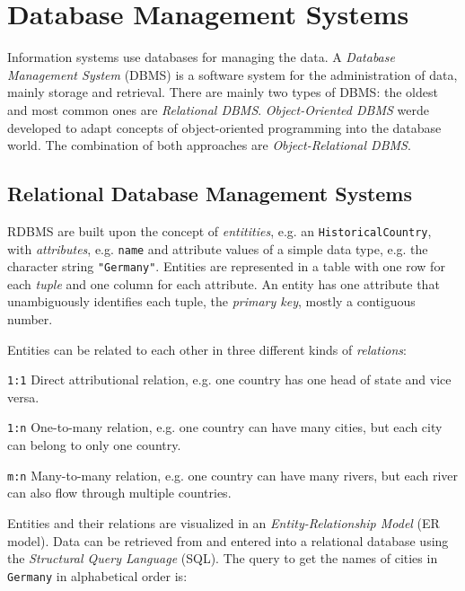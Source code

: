 
\section{Database Management Systems} %
\label{sec:database_management_systems}

Information systems use databases for managing the data. A \emph{Database Management System} (DBMS) is a software system for the administration of data, mainly storage and retrieval. There are mainly two types of DBMS: the oldest and most common ones are \emph{Relational DBMS}. \emph{Object-Oriented DBMS} werde developed to adapt concepts of object-oriented programming into the database world. The combination of both approaches are \emph{Object-Relational DBMS}.

\subsection{Relational Database Management Systems} %
\label{sub:relational_database_management_systems}

RDBMS are built upon the concept of \emph{entitities}, e.g. an \texttt{HistoricalCountry}, with \emph{attributes}, e.g. \texttt{name} and attribute values of a simple data type, e.g. the character string \texttt{"Germany"}. Entities are represented in a table with one row for each \emph{tuple} and one column for each attribute. An entity has one attribute that unambiguously identifies each tuple, the \emph{primary key}, mostly a contiguous number.

Entities can be related to each other in three different kinds of \emph{relations}:
\begin{compactenum}
  \item[\texttt{1:1}] Direct attributional relation, e.g. one country has one head of state and vice versa.
  \item[\texttt{1:n}] One-to-many relation, e.g. one country can have many cities, but each city can belong to only one country.
  \item[\texttt{m:n}] Many-to-many relation, e.g. one country can have many rivers, but each river can also flow through multiple countries.
\end{compactenum}

Entities and their relations are visualized in an \emph{Entity-Relationship Model} (ER model). Data can be retrieved from and entered into a relational database using the \emph{Structural Query Language} (SQL). The query to get the names of cities in \texttt{Germany} in alphabetical order is:

